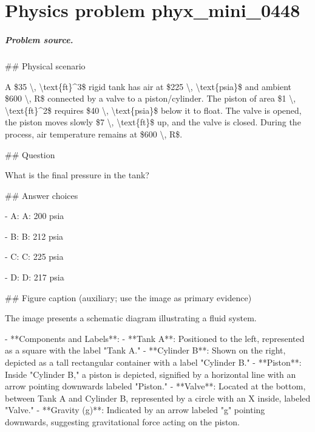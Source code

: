 
\chapter{Physics problem phyx\_mini\_0448}
\label{ch:PhyXMiniProblems_problem_phyx_mini_0448}

\paragraph{Problem source.}
\#\# Physical scenario

A \$35 \textbackslash{}, \textbackslash{}text\{ft\}\textasciicircum{}3\$ rigid tank has air at \$225 \textbackslash{}, \textbackslash{}text\{psia\}\$ and ambient \$600 \textbackslash{}, R\$ connected by a valve to a piston/cylinder. The piston of area \$1 \textbackslash{}, \textbackslash{}text\{ft\}\textasciicircum{}2\$ requires \$40 \textbackslash{}, \textbackslash{}text\{psia\}\$ below it to float. The valve is opened, the piston moves slowly \$7 \textbackslash{}, \textbackslash{}text\{ft\}\$ up, and the valve is closed. During the process, air temperature remains at \$600 \textbackslash{}, R\$.

\#\# Question

What is the final pressure in the tank?

\#\# Answer choices

- A: A: 200 psia

- B: B: 212 psia

- C: C: 225 psia

- D: D: 217 psia

\#\# Figure caption (auxiliary; use the image as primary evidence)

The image presents a schematic diagram illustrating a fluid system. 

- **Components and Labels**:
  - **Tank A**: Positioned to the left, represented as a square with the label "Tank A."
  - **Cylinder B**: Shown on the right, depicted as a tall rectangular container with a label "Cylinder B."
  - **Piston**: Inside "Cylinder B," a piston is depicted, signified by a horizontal line with an arrow pointing downwards labeled "Piston."
  - **Valve**: Located at the bottom, between Tank A and Cylinder B, represented by a circle with an X inside, labeled "Valve."
  - **Gravity (g)**: Indicated by an arrow labeled "g" pointing downwards, suggesting gravitational force acting on the piston.


